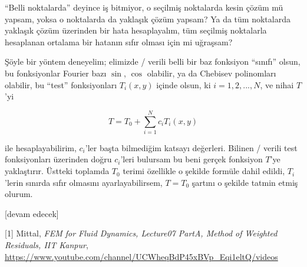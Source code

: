 \documentclass[12pt,fleqn]{article}\usepackage{../../common}
\begin{document}
``Belli noktalarda'' deyince iş bitmiyor, o seçilmiş noktalarda kesin çözüm mü
yapsam, yoksa o noktalarda da yaklaşık çözüm yapsam? Ya da tüm noktalarda
yaklaşık çözüm üzerinden bir hata hesaplayalım, tüm seçilmiş noktalarla 
hesaplanan ortalama bir hatanın sıfır olması için mi uğraşsam?

Şöyle bir yöntem deneyelim; elimizde / verili belli bir baz fonksiyon ``sınıfı''
olsun, bu fonksiyonlar Fourier bazı $\sin$, $\cos$ olabilir, ya da Chebisev
polinomları olabilir, bu ``test'' fonksiyonları $T_i(x,y)$ içinde olsun, ki
$i=1,2,...,N$, ve nihai $T$'yi

$$
T = T_0 + \sum _{i=1}^{N} c_i T_i(x,y)
$$

ile hesaplayabilirim, $c_i$'ler başta bilmediğim katsayı değerleri. Bilinen /
verili test fonksiyonları üzerinden doğru $c_i$'leri bulursam bu beni gerçek
fonksiyon $T$'ye yaklaştırır. Üstteki toplamda $T_0$ terimi özellikle o
şekilde formüle dahil edildi, $T_i$'lerin sınırda sıfır olmasını
ayarlayabilirsem, $T=T_0$ şartını o şekilde tatmin etmiş olurum.





















[devam edecek]

[1] Mittal, {\em FEM for Fluid Dynamics, Lecture07 PartA, Method of Weighted Residuals, IIT Kanpur},
    \url{https://www.youtube.com/channel/UCWheqBdP45xBVp_Eqi1eltQ/videos}
\end{document}
